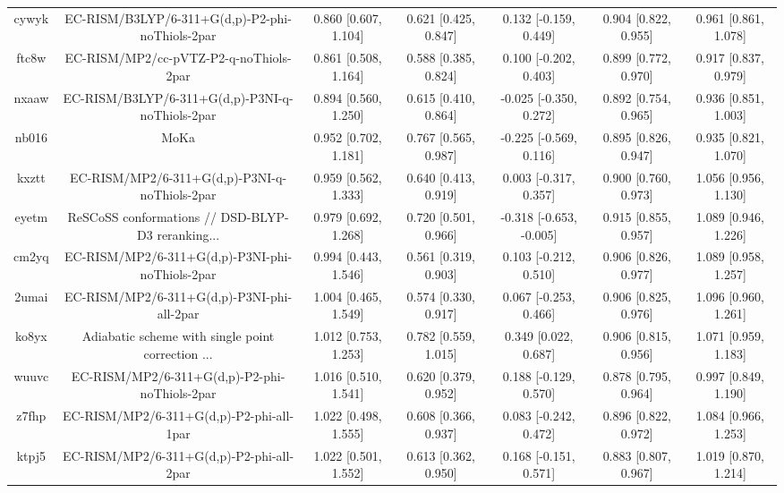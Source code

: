 \documentclass{article}
\begin{document}
\begin{center}
\begin{longtable}{|ccccccc|}
 cywyk &    EC-RISM/B3LYP/6-311+G(d,p)-P2-phi-noThiols-2par &  0.860 [0.607, 1.104] &  0.621 [0.425, 0.847] &    0.132 [-0.159, 0.449] &  0.904 [0.822, 0.955] &   0.961 [0.861, 1.078] \\
 ftc8w &             EC-RISM/MP2/cc-pVTZ-P2-q-noThiols-2par &  0.861 [0.508, 1.164] &  0.588 [0.385, 0.824] &    0.100 [-0.202, 0.403] &  0.899 [0.772, 0.970] &   0.917 [0.837, 0.979] \\
 nxaaw &    EC-RISM/B3LYP/6-311+G(d,p)-P3NI-q-noThiols-2par &  0.894 [0.560, 1.250] &  0.615 [0.410, 0.864] &   -0.025 [-0.350, 0.272] &  0.892 [0.754, 0.965] &   0.936 [0.851, 1.003] \\
 nb016 &                                               MoKa &  0.952 [0.702, 1.181] &  0.767 [0.565, 0.987] &   -0.225 [-0.569, 0.116] &  0.895 [0.826, 0.947] &   0.935 [0.821, 1.070] \\
 kxztt &      EC-RISM/MP2/6-311+G(d,p)-P3NI-q-noThiols-2par &  0.959 [0.562, 1.333] &  0.640 [0.413, 0.919] &    0.003 [-0.317, 0.357] &  0.900 [0.760, 0.973] &   1.056 [0.956, 1.130] \\
 eyetm &  ReSCoSS conformations // DSD-BLYP-D3 reranking... &  0.979 [0.692, 1.268] &  0.720 [0.501, 0.966] &  -0.318 [-0.653, -0.005] &  0.915 [0.855, 0.957] &   1.089 [0.946, 1.226] \\
 cm2yq &    EC-RISM/MP2/6-311+G(d,p)-P3NI-phi-noThiols-2par &  0.994 [0.443, 1.546] &  0.561 [0.319, 0.903] &    0.103 [-0.212, 0.510] &  0.906 [0.826, 0.977] &   1.089 [0.958, 1.257] \\
 2umai &         EC-RISM/MP2/6-311+G(d,p)-P3NI-phi-all-2par &  1.004 [0.465, 1.549] &  0.574 [0.330, 0.917] &    0.067 [-0.253, 0.466] &  0.906 [0.825, 0.976] &   1.096 [0.960, 1.261] \\
 ko8yx &  Adiabatic scheme with single point correction ... &  1.012 [0.753, 1.253] &  0.782 [0.559, 1.015] &     0.349 [0.022, 0.687] &  0.906 [0.815, 0.956] &   1.071 [0.959, 1.183] \\
 wuuvc &      EC-RISM/MP2/6-311+G(d,p)-P2-phi-noThiols-2par &  1.016 [0.510, 1.541] &  0.620 [0.379, 0.952] &    0.188 [-0.129, 0.570] &  0.878 [0.795, 0.964] &   0.997 [0.849, 1.190] \\
 z7fhp &           EC-RISM/MP2/6-311+G(d,p)-P2-phi-all-1par &  1.022 [0.498, 1.555] &  0.608 [0.366, 0.937] &    0.083 [-0.242, 0.472] &  0.896 [0.822, 0.972] &   1.084 [0.966, 1.253] \\
 ktpj5 &           EC-RISM/MP2/6-311+G(d,p)-P2-phi-all-2par &  1.022 [0.501, 1.552] &  0.613 [0.362, 0.950] &    0.168 [-0.151, 0.571] &  0.883 [0.807, 0.967] &   1.019 [0.870, 1.214] \\

\end{longtable}
\end{center}
\end{document}
